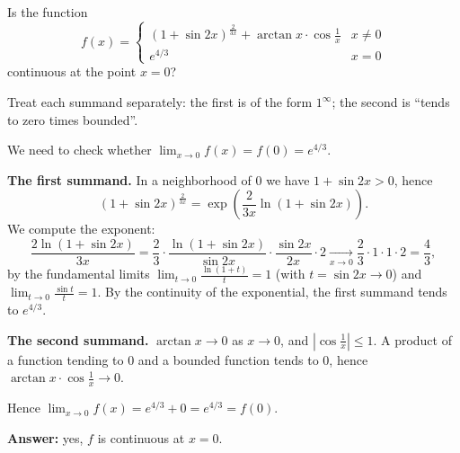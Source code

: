 
\begin{question}
Is the function
\[
f(x)=\begin{cases}(1+\sin2x)^{\frac{2}{3x}}+\arctan x\cdot\cos\frac1x & x\neq0\\ e^{4/3} & x=0\end{cases}
\]
continuous at the point $x=0$?
\end{question}

\begin{hint}
Treat each summand separately: the first is of the form $1^\infty$; the second is ``tends to zero times bounded''.
\end{hint}

\begin{solution}
We need to check whether $\lim_{x\to0}f(x)=f(0)=e^{4/3}$.

\textbf{The first summand.} In a neighborhood of $0$ we have $1+\sin2x>0$, hence
\[
(1+\sin2x)^{\frac{2}{3x}}=\exp\left(\frac{2}{3x}\ln(1+\sin2x)\right).
\]
We compute the exponent:
\[
\frac{2\ln(1+\sin2x)}{3x}=\frac23\cdot\frac{\ln(1+\sin2x)}{\sin2x}\cdot\frac{\sin2x}{2x}\cdot2\xrightarrow[x\to0]{}\frac23\cdot1\cdot1\cdot2=\frac43,
\]
by the fundamental limits $\lim_{t\to0}\frac{\ln(1+t)}{t}=1$ (with $t=\sin2x\to0$) and $\lim_{t\to0}\frac{\sin t}{t}=1$. By the continuity of the exponential, the first summand tends to $e^{4/3}$.

\textbf{The second summand.} $\arctan x\to0$ as $x\to0$, and $\left|\cos\frac1x\right|\le1$. A product of a function tending to $0$ and a bounded function tends to $0$, hence $\arctan x\cdot\cos\frac1x\to0$.

Hence $\lim_{x\to0}f(x)=e^{4/3}+0=e^{4/3}=f(0)$.

\textbf{Answer:} yes, $f$ is continuous at $x=0$.
\end{solution}
